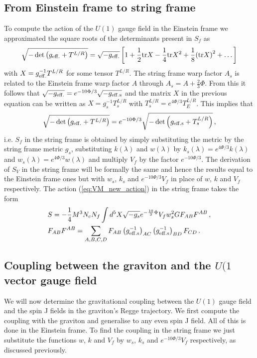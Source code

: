 \documentclass[a4paper,12pt]{article}
\begin{document}
\subsection*{From Einstein frame to string frame}
To compute the action of the $U(1)$ gauge field in the Einstein frame we approximated the square roots of the determinants present in $S_f$ as
\begin{align}
\sqrt{-\det \left( g_{\rm{eff.}} + T^{L/R} \right)} = \sqrt{-g_{\rm{eff.}}} \left[ 1 + \frac{1}{2} \text{tr} X - \frac{1}{4} \text{tr} X^2 + \frac{1}{8} {\left( \text{tr} X \right)}^2 + \dots \right]
\end{align}
with $X = g^{-1}_{\rm{eff.}} T^{L/R}$ for some tensor $T^{L/R}$.
The string frame warp factor $A_s$ is related to the Einstein frame warp factor $A$ through $A_s = A + \frac{2}{3} \Phi$. From this it follows that $\sqrt{-g_{\rm{eff.}}} = e^{- 10 \Phi / 3} \sqrt{-g_{\rm{eff.} s}}$ and the matrix $X$ in the previous equation can be written as $X = g_s^{-1} T^{L/R}_s$ with $T^{L/R}_s = e^{4 \Phi / 3} T^{L/R}_E$. This implies that
\begin{align}
\sqrt{-\det \left( g_{\rm{eff.}} + T^{L/R} \right)} = e^{- 10 \Phi / 3} \sqrt{-\det \left( g_{\rm{eff.} s} + T^{L/R}_s \right)} \, ,
\end{align}
i.e.  $S_f$ in the string frame is obtained by simply substituting the metric by the string frame metric $g_s$, substituting $k\left(\lambda\right)$ and $w\left(\lambda\right)$ by $k_s \left(\lambda\right) = e^{4 \Phi / 3} k\left(\lambda\right) $ and $w_s \left(\lambda\right) = e^{4 \Phi / 3} w\left(\lambda\right) $ and multiply $V_f$ by the factor $e^{-10 \Phi / 3}$. The derivation of $S_V$ in the string frame will be formally the same and hence the results equal to the Einstein frame ones but with $w_s$, $k_s$ and $e^{-10 \Phi / 3} V_f$ in place of $w$, $k$ and $V_f$ respectively. The action (\ref{eq:VM_new_action}) in the string frame takes the form
\begin{align}
&S = - \frac{1}{4} M^3 N_c N_f \int d^5 X \sqrt{-g_s} e^{-\frac{10}{3} \Phi} V_f w_s^2 G F_{AB}F^{AB}  \, , \\
& F_{AB}F^{AB} =  \sum_{A,B,C,D}F_{AB} \left(g^{-1}_{\rm{eff.} s}\right)_{AC} \left(g^{-1}_{\rm{eff.} s}\right)_{BD} F_{CD} \, .
\label{eq:VM_new_action_string_frame}
\end{align}


\subsection*{Coupling between the graviton and the $U(1$ vector gauge field}
We will now determine the gravitational coupling between the $U(1)$ gauge field and the spin J fields in the graviton's Regge trajectory. We first compute the coupling with the graviton and generalise to any even spin J field. All of this is done in the Einstein frame. To find the coupling in the string frame we just substitute the functions $w$, $k$ and $V_f$ by $w_s$, $k_s$ and $e^{-10 \Phi / 3} V_f$ respectively, as discussed previously. 
\end{document}
